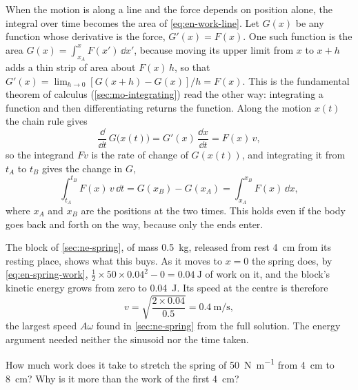 When the motion is along a line and the force depends on position alone,
the integral over time becomes the area of \cref{eq:en-work-line}. Let
$G(x)$ be any function whose derivative is the force, $G'(x) = F(x)$. One
such function is the area $G(x) = \int_{x_A}^{x} F(x')\,\dd x'$, because
moving its upper limit from $x$ to $x + h$ adds a thin strip of area about
$F(x)\,h$, so that $G'(x) = \lim_{h\to0}[G(x+h) - G(x)]/h = F(x)$. This is
the fundamental theorem of calculus (\cref{sec:mo-integrating}) read the
other way: integrating a function and then differentiating returns the
function. Along the motion $x(t)$ the chain
rule gives
\begin{equation*}
   \frac{\dd}{\dd t}\,G\bigl(x(t)\bigr) = G'(x)\,\frac{\dd x}{\dd t}
   = F(x)\,v ,
\end{equation*}
so the integrand $F v$ is the rate of change of $G(x(t))$, and
integrating it from $t_A$ to $t_B$ gives the change in $G$,
\begin{equation*}
   \int_{t_A}^{t_B} F(x)\,v\,\dd t = G(x_B) - G(x_A)
   = \int_{x_A}^{x_B} F(x)\,\dd x ,
\end{equation*}
where $x_A$ and $x_B$ are the positions at the two times. This holds even
if the body goes back and forth on the way, because only the ends enter.

The block of \cref{sec:ne-spring}, of mass \SI{0.5}{\kilogram}, released
from rest \SI{4}{\centi\metre} from its resting place, shows what this
buys. As it moves to $x = 0$ the spring does, by
\cref{eq:en-spring-work}, $\frac12\times50\times0.04^2 - 0 =
\SI{0.04}{\joule}$ of work on it, and the block's kinetic energy grows
from zero to \SI{0.04}{\joule}. Its speed at the centre is therefore
\begin{equation*}
   v = \sqrt{\frac{2\times0.04}{0.5}} = \SI{0.4}{\metre\per\second} ,
\end{equation*}
the largest speed $A\omega$ found in \cref{sec:ne-spring} from the full
solution. The energy argument needed neither the sinusoid nor the time
taken.

\begin{selfcheck}
How much work does it take to stretch the spring of
\SI{50}{\newton\per\metre} from \SI{4}{\centi\metre} to
\SI{8}{\centi\metre}? Why is it more than the work of the first
\SI{4}{\centi\metre}?
\end{selfcheck}

